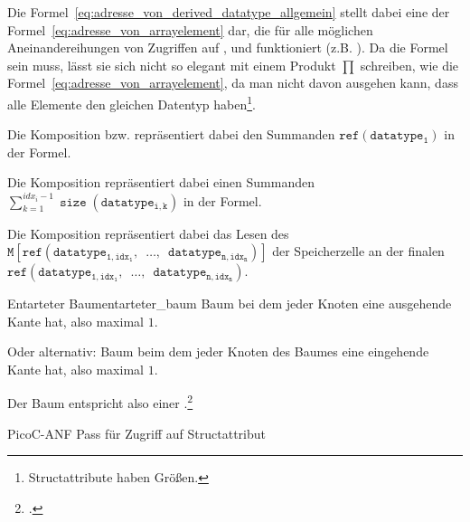 \begin{Special_Paragraph}
  Die Formel~\ref{eq:adresse_von_derived_datatype_allgemein} stellt dabei eine  der Formel~\ref{eq:adresse_von_arrayelement} dar, die für alle möglichen Aneinandereihungen von Zugriffen auf ,  und  funktioniert (z.B. ). Da die Formel  sein muss, lässt sie sich nicht so elegant mit einem Produkt $\prod$ schreiben, wie die Formel~\ref{eq:adresse_von_arrayelement}, da man nicht davon ausgehen kann, dass alle Elemente den gleichen Datentyp haben\footnote{Structattribute haben  Größen.}.

  Die Komposition  bzw.  repräsentiert dabei den Summanden $\mathtt{ref(datatype_1)}$ in der Formel.

  Die Komposition  repräsentiert dabei einen Summanden $\sum_{k=1}^{idx_i - 1} \mathtt{\operatorname{size}(datatype_{i, k})}$ in der Formel.

Die Komposition  repräsentiert dabei das Lesen des  $\mathtt{M\left[ref(datatype_{1, idx_1},\enspace\ldots,\enspace datatype_{n, idx_n})\right]}$ der Speicherzelle an der finalen  $\mathtt{ref(datatype_{1, idx_1},\enspace\ldots,\enspace datatype_{n, idx_n})}$.
\end{Special_Paragraph}

\begin{Definition}{Entarteter Baum}{entarteter_baum}
  Baum bei dem jeder Knoten  eine ausgehende Kante hat, also maximal  $1$.

  \textnormal{Oder alternativ:} Baum beim dem jeder Knoten des Baumes  eine eingehende Kante hat, also maximal  $1$.

  Der Baum entspricht also einer .\footcite{noauthor_baume_nodate}
\end{Definition}


\begin{code}
  \centering
  \caption{PicoC-ANF Pass für Zugriff auf Structattribut}
  \label{code:picoc_mon_pass_für_zugriff_auf_structattribut}
\end{code}


